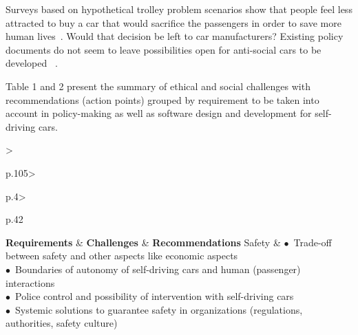 Surveys based on hypothetical trolley problem scenarios show that people feel less attracted to buy a car that would sacrifice the passengers in order to save more human lives~\cite{Bonnefon2016}. Would that decision be left to car manufacturers? Existing policy documents do not seem to leave possibilities open for anti-social cars to be developed~ \cite{EthicsCommission2017pr,EthicsCommission2017b,Pillath2016,NHTSA2016PolicyUpdate,DBLP:journals/corr/CharisiDFLMSSWY17}.

Table 1 and 2 present the summary of ethical and social challenges with  recommendations (action points) grouped by requirement to be taken into account in policy-making as well as software design and development for self-driving cars. 


\begin{table}[t]
	\centering
	\caption{Summary of the technical challenges and recommendations grouped by requirement}
	\label{tab:Findings}
	\begin{small}
		\begin{supertabular}{%
		>{\raggedright}p{.105\textwidth}>{\raggedright}p{.4\textwidth}>{\raggedright}p{.42\textwidth}}
			\toprule
			 {\bf Requirements} & {\bf Challenges} & {\bf Recommendations}  \tabularnewline
			\midrule
			\vspace{.1cm}Safety & \vspace{.1cm}
					\noindent $\bullet$~Trade-off between safety and other aspects like economic aspects\\
					\noindent $\bullet$~Boundaries of autonomy of self-driving cars and human (passenger) interactions\\
					\noindent $\bullet$~Police control and possibility of intervention with self-driving cars\\
					\noindent $\bullet$~Systemic solutions to guarantee safety in organizations (regulations, authorities, safety culture) %

\end{supertabular}
\end{small}
\end{table}
